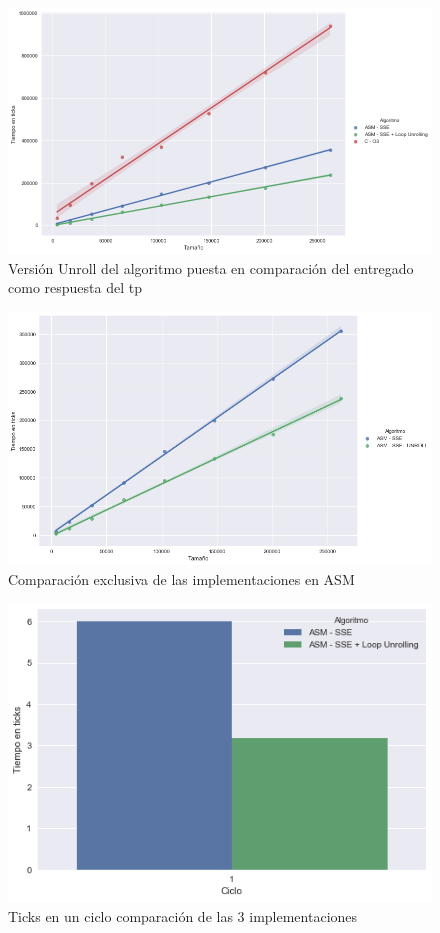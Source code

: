 \begin{figure}[H]
	\centering
	\includegraphics[scale=0.5]{img/fourCombine_UnrollvsNormal.png}
	\caption{Versión Unroll del algoritmo puesta en comparación del entregado como respuesta del tp}
	\label{fourCombine_unroolvsnormal}
\end{figure}

\begin{figure}[H]
	\centering
	\includegraphics[scale=0.5]{img/fourCombine_UnrollvsNormal_asmOnly.png}
	\caption{Comparación exclusiva de las implementaciones en ASM}
	\label{fourCombine_unroolvsnormal_asmOnly}
\end{figure}

\begin{figure}[H]
	\centering
	\includegraphics[scale=0.5]{img/fourCombine_ticks_en_ciclo.png}
	\caption{Ticks en un ciclo comparación de las 3 implementaciones}
	\label{fourCombine_ticksciclo}
\end{figure}

